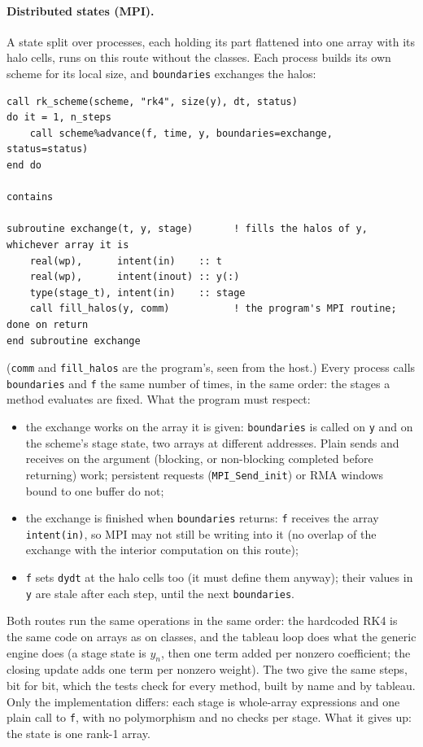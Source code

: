 \documentclass[11pt,a4paper]{article}
\newcommand{\code}[1]{\texttt{#1}}
\begin{document}
\paragraph{Distributed states (MPI).} A state split over processes, each
holding its part flattened into one array with its halo cells, runs on this
route without the classes. Each process builds its own scheme for its local
size, and \code{boundaries} exchanges the halos:
\begin{lstlisting}
call rk_scheme(scheme, "rk4", size(y), dt, status)
do it = 1, n_steps
    call scheme%advance(f, time, y, boundaries=exchange, status=status)
end do

contains

subroutine exchange(t, y, stage)       ! fills the halos of y, whichever array it is
    real(wp),      intent(in)    :: t
    real(wp),      intent(inout) :: y(:)
    type(stage_t), intent(in)    :: stage
    call fill_halos(y, comm)           ! the program's MPI routine; done on return
end subroutine exchange
\end{lstlisting}
(\code{comm} and \code{fill\_halos} are the program's, seen from the host.)
Every process calls \code{boundaries} and \code{f} the same number of times, in
the same order: the stages a method evaluates are fixed. What the program must
respect:
\begin{itemize}
  \item the exchange works on the array it is given: \code{boundaries} is
    called on \code{y} and on the scheme's stage state, two arrays at
    different addresses. Plain sends and receives on the argument (blocking,
    or non-blocking completed before returning) work; persistent requests
    (\code{MPI\_Send\_init}) or RMA windows bound to one buffer do not;
  \item the exchange is finished when \code{boundaries} returns: \code{f}
    receives the array \code{intent(in)}, so MPI may not still be writing
    into it (no overlap of the exchange with the interior computation on
    this route);
  \item \code{f} sets \code{dydt} at the halo cells too (it must define them
    anyway); their values in \code{y} are stale after each step, until the
    next \code{boundaries}.
\end{itemize}

Both routes run the same operations in the same order: the hardcoded RK4 is
the same code on arrays as on classes, and the tableau loop does what the
generic engine does (a stage state is $y_n$, then one term added per nonzero
coefficient; the closing update adds one term per nonzero weight). The two
give the same steps, bit for bit, which the tests check for every method,
built by name and by tableau. Only the implementation differs: each stage is
whole-array expressions and one plain call to \code{f}, with no polymorphism
and no checks per stage. What it gives up: the state is one rank-1 array.
\end{document}
